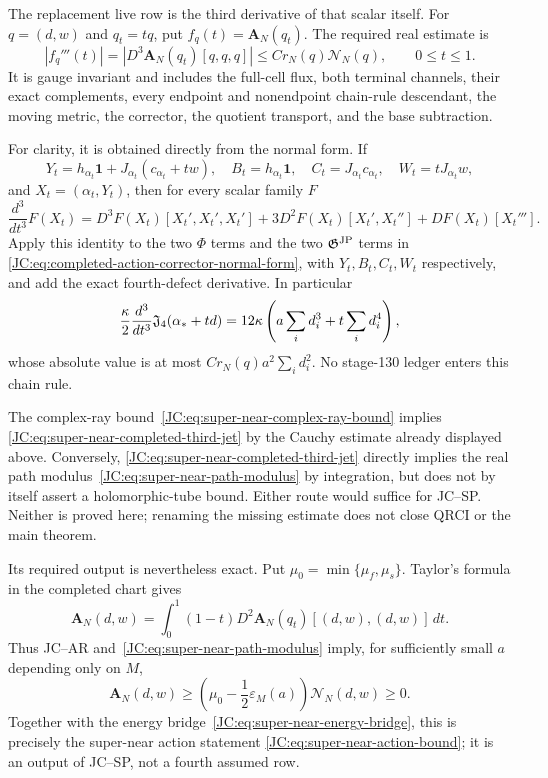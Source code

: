 \begin{contract}
\begin{remark}
The replacement live row is the third derivative of that scalar itself.
For $q=(d,w)$ and $q_t=tq$, put
$f_q(t)=\mathbf A_N(q_t)$.  The required real estimate is
\begin{equation}\label{JC:eq:super-near-completed-third-jet}
 \boxed{
 |f_q'''(t)|
 =|D^3\mathbf A_N(q_t)[q,q,q]|
 \le C r_N(q)\mathcal N_N(q),\qquad0\le t\le1.}
\end{equation}
It is gauge invariant and includes the full-cell flux, both terminal
channels, their exact complements, every endpoint and nonendpoint
chain-rule descendant, the moving metric, the corrector, the quotient
transport, and the base subtraction.

For clarity, it is obtained directly from the normal form.  If
\[
 Y_t=h_{\alpha_t}\mathbf1+J_{\alpha_t}(c_{\alpha_t}+tw),\quad
 B_t=h_{\alpha_t}\mathbf1,\quad
 C_t=J_{\alpha_t}c_{\alpha_t},\quad
 W_t=tJ_{\alpha_t}w,
\]
and $X_t=(\alpha_t,Y_t)$, then for every scalar family $F$
\[
 \frac{d^3}{dt^3}F(X_t)
 =D^3F(X_t)[X_t',X_t',X_t']
  +3D^2F(X_t)[X_t',X_t'']+DF(X_t)[X_t'''].
\]
Apply this identity to the two $\Phi$ terms and the two $\mathfrak G^{\rm JP}$ terms in
\eqref{JC:eq:completed-action-corrector-normal-form}, with $Y_t,B_t,C_t,W_t$
respectively, and add the exact fourth-defect derivative.  In particular
\[
 \frac\kappa2\frac{d^3}{dt^3}\mathfrak J_4(\alpha_*+td)
 =12\kappa\left(a\sum_i d_i^3+t\sum_i d_i^4\right),
\]
whose absolute value is at most
$Cr_N(q)a^2\sum_i d_i^2$.  No stage-130 ledger enters this chain rule.

The complex-ray bound~\eqref{JC:eq:super-near-complex-ray-bound} implies
\eqref{JC:eq:super-near-completed-third-jet} by the Cauchy estimate already
displayed above.  Conversely,
\eqref{JC:eq:super-near-completed-third-jet} directly implies the real path
modulus~\eqref{JC:eq:super-near-path-modulus} by integration, but does not by
itself assert a holomorphic-tube bound.  Either route would suffice for
JC--SP.  Neither is proved here; renaming the missing estimate does not
close QRCI or the main theorem.
\end{remark}

Its required output is nevertheless exact.  Put
$\mu_0=\min\{\mu_f,\mu_s\}$.  Taylor's formula in the completed chart gives
\[
 \mathbf A_N(d,w)=
 \int_0^1(1-t)D^2\mathbf A_N(q_t)[(d,w),(d,w)]\,dt.
\]
Thus JC--AR and~\eqref{JC:eq:super-near-path-modulus} imply, for sufficiently
small $a$ depending only on $M$,
\begin{equation}\label{JC:eq:JC-SP-output}
 \boxed{
 \mathbf A_N(d,w)\ge
 \left(\mu_0-\frac12\varepsilon_M(a)\right)\mathcal N_N(d,w)
 \ge0.}
\end{equation}
Together with the energy bridge~\eqref{JC:eq:super-near-energy-bridge}, this
is precisely the super-near action statement
\eqref{JC:eq:super-near-action-bound}; it is an output of JC--SP, not a
fourth assumed row.
\end{contract}

